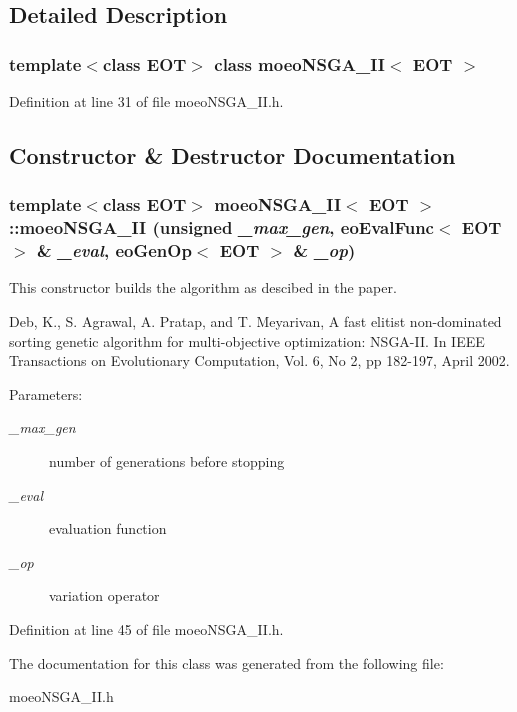 \subsection{Detailed Description}
\subsubsection*{template$<$class EOT$>$ class moeo\-NSGA\_\-II$<$ EOT $>$}





Definition at line 31 of file moeo\-NSGA\_\-II.h.

\subsection{Constructor \& Destructor Documentation}
\subsubsection{\setlength{\rightskip}{0pt plus 5cm}template$<$class EOT$>$ {\bf moeo\-NSGA\_\-II}$<$ EOT $>$::{\bf moeo\-NSGA\_\-II} (unsigned {\em \_\-max\_\-gen}, {\bf eo\-Eval\-Func}$<$ EOT $>$ \& {\em \_\-eval}, {\bf eo\-Gen\-Op}$<$ EOT $>$ \& {\em \_\-op})\hspace{0.3cm}{\tt  [inline]}}\label{classmoeoNSGA__II_bdbf13431487a83afdfd4f527f99ebcf}


This constructor builds the algorithm as descibed in the paper. 

Deb, K., S. Agrawal, A. Pratap, and T. Meyarivan, A fast elitist non-dominated sorting genetic algorithm for multi-objective optimization: NSGA-II. In IEEE Transactions on Evolutionary Computation, Vol. 6, No 2, pp 182-197, April 2002. \begin{Desc}
\item[Parameters:]
\begin{description}
\item[{\em \_\-max\_\-gen}]number of generations before stopping \item[{\em \_\-eval}]evaluation function \item[{\em \_\-op}]variation operator \end{description}
\end{Desc}


Definition at line 45 of file moeo\-NSGA\_\-II.h.

The documentation for this class was generated from the following file:\begin{CompactItemize}
\item 
moeo\-NSGA\_\-II.h\end{CompactItemize}

